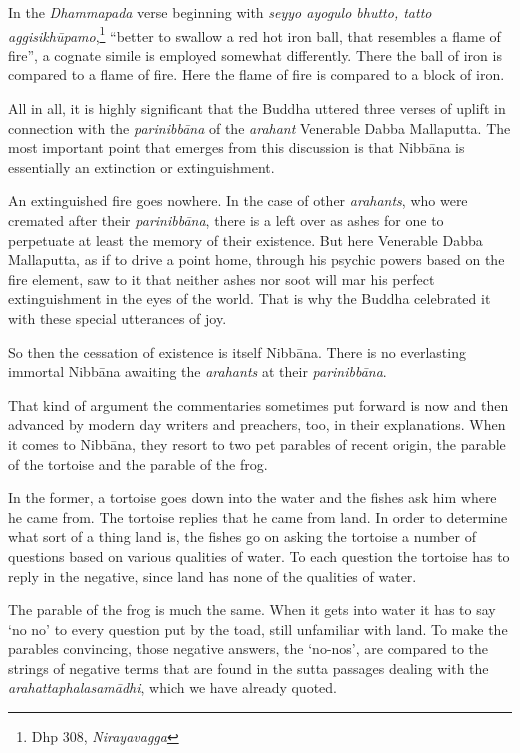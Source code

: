 In the \emph{Dhammapada} verse beginning with \emph{seyyo ayogulo bhutto, tatto aggisikhūpamo},\footnote{Dhp 308, \emph{Nirayavagga}} ``better to swallow a red hot iron ball, that resembles a flame of fire'', a cognate simile is employed somewhat differently. There the ball of iron is compared to a flame of fire. Here the flame of fire is compared to a block of iron.

All in all, it is highly significant that the Buddha uttered three verses of uplift in connection with the \emph{parinibbāna} of the \emph{arahant} Venerable Dabba Mallaputta. The most important point that emerges from this discussion is that Nibbāna is essentially an extinction or extinguishment.

An extinguished fire goes nowhere. In the case of other \emph{arahants}, who were cremated after their \emph{parinibbāna}, there is a left over as ashes for one to perpetuate at least the memory of their existence. But here Venerable Dabba Mallaputta, as if to drive a point home, through his psychic powers based on the fire element, saw to it that neither ashes nor soot will mar his perfect extinguishment in the eyes of the world. That is why the Buddha celebrated it with these special utterances of joy.

So then the cessation of existence is itself Nibbāna. There is no everlasting immortal Nibbāna awaiting the \emph{arahants} at their \emph{parinibbāna}.

That kind of argument the commentaries sometimes put forward is now and then advanced by modern day writers and preachers, too, in their explanations. When it comes to Nibbāna, they resort to two pet parables of recent origin, the parable of the tortoise and the parable of the frog.

In the former, a tortoise goes down into the water and the fishes ask him where he came from. The tortoise replies that he came from land. In order to determine what sort of a thing land is, the fishes go on asking the tortoise a number of questions based on various qualities of water. To each question the tortoise has to reply in the negative, since land has none of the qualities of water.

The parable of the frog is much the same. When it gets into water it has to say `no no' to every question put by the toad, still unfamiliar with land. To make the parables convincing, those negative answers, the `no-nos', are compared to the strings of negative terms that are found in the sutta passages dealing with the \emph{arahattaphalasamādhi}, which we have already quoted.

